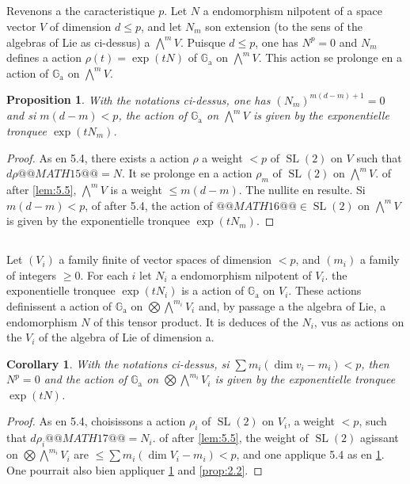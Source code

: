 \documentclass[11pt,a4paper]{article}
\theoremstyle{plain}
\newtheorem{proposition}[theorem]{Proposition}
\newtheorem{corollary}[theorem]{Corollary}
\theoremstyle{definition}
\DeclareMathOperator{\SL}{SL}
\newcommand{\Ga}{\mathbb{G}_\mathrm{a}}
\begin{document}
\subsection{}
Revenons a the caracteristique $p$. Let $N$ a endomorphism nilpotent of a space vector $V$ of dimension $d \leq p$, and let $N_m$ son extension (to the sens of the algebras of Lie as ci-dessus) a $\bigwedge^m V$. Puisque $d \leq p$, one has $N^p = 0$ and $N_m$ defines a action $\rho(t) = \exp(tN)$ of $\Ga$ on $\bigwedge^m V$. This action se prolonge en a action of $\Ga$ on $\bigwedge^m V$.

\begin{proposition}\label{prop:5.7}
With the notations ci-dessus, one has $(N_m)^{m(d - m) + 1} = 0$ and si $m(d - m) < p$, the action of $\Ga$ on $\bigwedge^m V$ is given by the exponentielle tronquee $\exp(tN_m)$.
\end{proposition}

\begin{proof}
As en 5.4, there exists a action $\rho$ a weight $< p$ of $\SL(2)$ on $V$ such that $d\rho @@MATH15@@ = N$. It se prolonge en a action $\rho_m$ of $\SL(2)$ on $\bigwedge^m V$. of after \ref{lem:5.5}, $\bigwedge^m V$ is a weight $\leq m(d - m)$. The nullite en resulte. Si $m(d - m) < p$, of after 5.4, the action of $@@MATH16@@ \in \SL(2)$ on $\bigwedge^m V$ is given by the exponentielle tronquee $\exp(tN_m)$.
\end{proof}

\subsection{}
Let $(V_i)$ a family finite of vector spaces of dimension $< p$, and $(m_i)$ a family of integers $\geq 0$. For each $i$ let $N_i$ a endomorphism nilpotent of $V_i$. the exponentielle tronquee $\exp(tN_i)$ is a action of $\Ga$ on $V_i$. These actions definissent a action of $\Ga$ on $\bigotimes \bigwedge^{m_i} V_i$ and, by passage a the algebra of Lie, a endomorphism $N$ of this tensor product. It is deduces of the $N_i$, vus as actions on the $V_i$ of the algebra of Lie of dimension a.

\begin{corollary}\label{cor:5.9}
With the notations ci-dessus, si $\sum m_i(\dim v_i - m_i) < p$, then $N^p = 0$ and the action of $\Ga$ on $\bigotimes \bigwedge^{m_i} V_i$ is given by the exponentielle tronquee $\exp(tN)$.
\end{corollary}

\begin{proof}
As en 5.4, choisissons a action $\rho_i$ of $\SL(2)$ on $V_i$, a weight $< p$, such that $d\rho_i @@MATH17@@ = N_i$. of after \ref{lem:5.5}, the weight of $\SL(2)$ agissant on $\bigotimes \bigwedge^{m_i} V_i$ are $\leq \sum m_i(\dim V_i - m_i) < p$, and one applique 5.4 as en \ref{prop:5.7}. One pourrait also bien appliquer \ref{prop:5.7} and \ref{prop:2.2}.
\end{proof}
\end{document}
